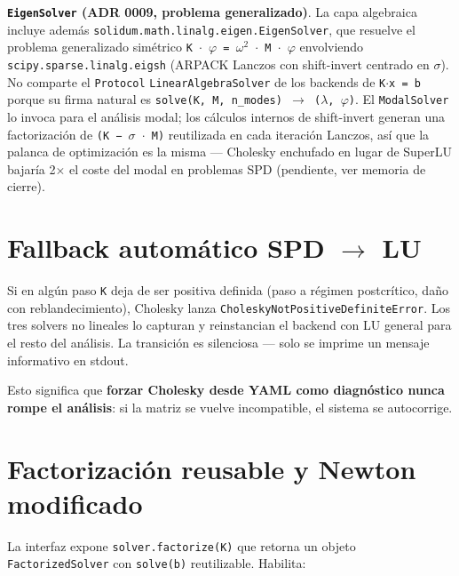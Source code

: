 \documentclass[11pt,letterpaper,oneside]{report}
\begin{document}
\textbf{\texttt{EigenSolver} (ADR 0009, problema generalizado)}. La capa algebraica incluye además \texttt{solidum.math.linalg.eigen.EigenSolver}, que resuelve el problema generalizado simétrico \texttt{K \ensuremath{\cdot} \ensuremath{\varphi} = \ensuremath{\omega}\ensuremath{^{2}} \ensuremath{\cdot} M \ensuremath{\cdot} \ensuremath{\varphi}} envolviendo \texttt{scipy.sparse.linalg.eigsh} (ARPACK Lanczos con shift-invert centrado en \texttt{\ensuremath{\sigma}}). No comparte el \texttt{Protocol} \texttt{LinearAlgebraSolver} de los backends de \texttt{K\ensuremath{\cdot}x = b} porque su firma natural es \texttt{solve(K, M, n\_modes) \ensuremath{\to} (\ensuremath{\lambda}, \ensuremath{\varphi})}. El \texttt{ModalSolver} lo invoca para el análisis modal; los cálculos internos de shift-invert generan una factorización de \texttt{(K − \ensuremath{\sigma} \ensuremath{\cdot} M)} reutilizada en cada iteración Lanczos, así que la palanca de optimización es la misma --- Cholesky enchufado en lugar de SuperLU bajaría 2\ensuremath{\times} el coste del modal en problemas SPD (pendiente, ver memoria de cierre).

\section{Fallback automático SPD \ensuremath{\to} LU}

Si en algún paso \texttt{K} deja de ser positiva definida (paso a régimen postcrítico, daño con reblandecimiento), Cholesky lanza \texttt{CholeskyNotPositiveDefiniteError}. Los tres solvers no lineales lo capturan y reinstancian el backend con LU general para el resto del análisis. La transición es silenciosa --- solo se imprime un mensaje informativo en stdout.

Esto significa que \textbf{forzar Cholesky desde YAML como diagnóstico nunca rompe el análisis}: si la matriz se vuelve incompatible, el sistema se autocorrige.

\section{Factorización reusable y Newton modificado}

La interfaz expone \texttt{solver.factorize(K)} que retorna un objeto \texttt{FactorizedSolver} con \texttt{solve(b)} reutilizable. Habilita:
\end{document}

